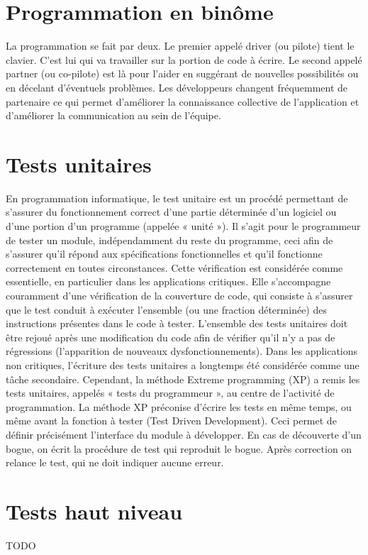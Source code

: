 \section{Programmation en binôme}\label{lexique:pairProgramming}
La programmation se fait par deux. Le premier appelé driver (ou pilote) tient le clavier. C'est lui qui va travailler sur la portion de code à écrire. Le second appelé partner (ou co-pilote) est là pour l'aider en suggérant de nouvelles possibilités ou en décelant d'éventuels problèmes. Les développeurs changent fréquemment de partenaire ce qui permet d'améliorer la connaissance collective de l'application et d'améliorer la communication au sein de l'équipe. 

\section{Tests unitaires}\label{lexique:testU}
En programmation informatique, le test unitaire est un procédé permettant de s'assurer du fonctionnement correct d'une partie déterminée d'un logiciel ou d'une portion d'un programme (appelée « unité »). Il s'agit pour le programmeur de tester un module, indépendamment du reste du programme, ceci afin de s'assurer qu'il répond aux spécifications fonctionnelles et qu'il fonctionne correctement en toutes circonstances. Cette vérification est considérée comme essentielle, en particulier dans les applications critiques. Elle s'accompagne couramment d'une vérification de la couverture de code, qui consiste à s'assurer que le test conduit à exécuter l'ensemble (ou une fraction déterminée) des instructions présentes dans le code à tester. L'ensemble des tests unitaires doit être rejoué après une modification du code afin de vérifier qu'il n'y a pas de régressions (l'apparition de nouveaux dysfonctionnements). Dans les applications non critiques, l'écriture des tests unitaires a longtemps été considérée comme une tâche secondaire. Cependant, la méthode Extreme programming (XP) a remis les tests unitaires, appelés « tests du programmeur », au centre de l'activité de programmation. La méthode XP préconise d'écrire les tests en même temps, ou même avant la fonction à tester (Test Driven Development). Ceci permet de définir précisément l'interface du module à développer. En cas de découverte d'un bogue, on écrit la procédure de test qui reproduit le bogue. Après correction on relance le test, qui ne doit indiquer aucune erreur.

\section{Tests haut niveau}\label{testHL}
TODO


